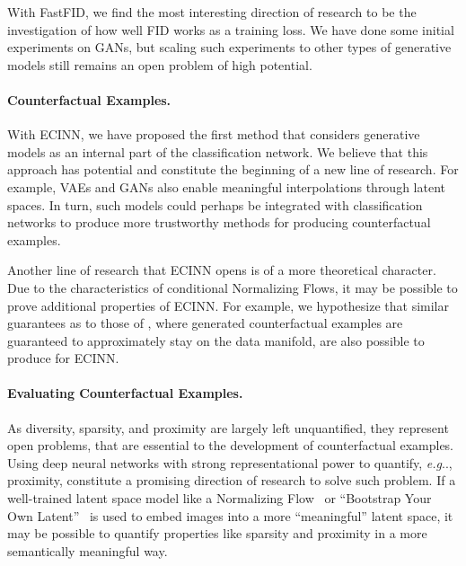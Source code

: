 \documentclass[11pt,a4paper,twoside,openright,final]{memoir}
\makeatletter
\DeclareRobustCommand\onedot{\futurelet\@let@token\@onedot}
\def\@onedot{\ifx\@let@token.\else.\null\fi\xspace}
\def\eg{\emph{e.g}\onedot} \def\Eg{\emph{E.g}\onedot}
\newcommand*{\paperref}[1]{Paper~\hyperref[#1]{\ref{#1}}}
\makeatother
\begin{document}
With FastFID, we find the most interesting direction of research to be the investigation of how well FID works as a training loss. 
We have done some initial experiments on GANs, but scaling such experiments to other types of generative models still remains an open problem of high potential. 

\paragraph{Counterfactual Examples.}
With ECINN, we have proposed the first method that considers generative models as an internal part of the classification network.
We believe that this approach has potential and constitute the beginning of a new line of research. 
For example, VAEs and GANs also enable meaningful interpolations through latent spaces.
In turn, such models could perhaps be integrated with classification networks to produce more trustworthy methods for producing counterfactual examples. 

Another line of research that ECINN opens is of a more theoretical character.
Due to the characteristics of conditional Normalizing Flows, it may be possible to prove additional properties of ECINN.
For example, we hypothesize that similar guarantees as to those of \cite{flowcounterfactuals}, where generated counterfactual examples are guaranteed to approximately stay on the data manifold, are also possible to produce for ECINN.

\paragraph{Evaluating Counterfactual Examples.}
As diversity, sparsity, and proximity are largely left unquantified, they represent open problems, that are essential to the development of counterfactual examples.
Using deep neural networks with strong representational power to quantify, \eg, proximity, constitute a promising direction of research to solve such problem.
If a well-trained latent space model like a Normalizing Flow~\cite{glow} or ``Bootstrap Your Own Latent''~\cite{byol} is used to embed images into a more ``meaningful'' latent space, it may be possible to quantify properties like sparsity and proximity in a more semantically meaningful way.
\end{document}
